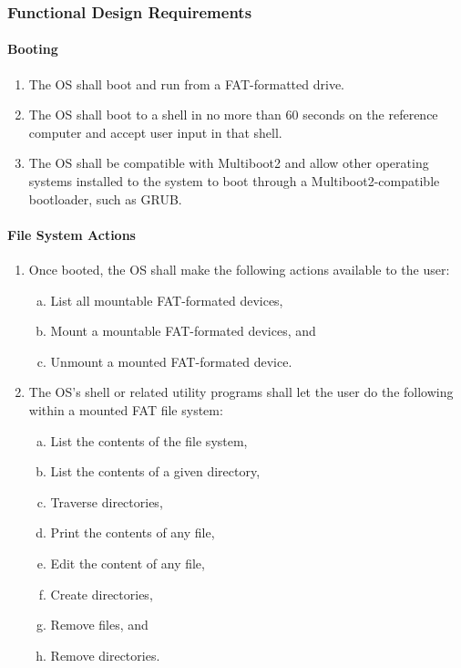 
\subsubsection{Functional Design Requirements}
  \paragraph{Booting}
  \begin{enumerate}
    \item The OS shall boot and run from a FAT-formatted drive.
    \item The OS shall boot to a shell in no more than 60 seconds on the reference computer and accept user input in that shell.
    \item The OS shall be compatible with Multiboot2 and allow other operating systems installed to the system to boot through a Multiboot2-compatible bootloader, such as GRUB.  
  \end{enumerate}
  \paragraph{File System Actions}
  \begin{enumerate}
    \item Once booted, the OS shall make the following actions available to the user:
    \begin{enumerate}[(a)]
      \item List all mountable FAT-formated devices,
      \item Mount a mountable FAT-formated devices, and
      \item Unmount a mounted FAT-formated device.
    \end{enumerate}
    \item The OS's shell or related utility programs shall let the user do the
      following within a mounted FAT file system:
    \begin{enumerate}[(a)]
      \item List the contents of the file system,
      \item List the contents of a given directory,
      \item Traverse directories,
      \item Print the contents of any file,
      \item Edit the content of any file,
      \item Create directories,
      \item Remove files, and
      \item Remove directories.
    \end{enumerate}
  \end{enumerate}
